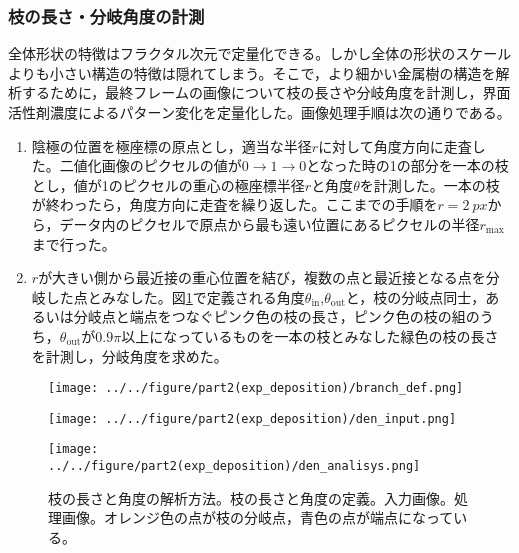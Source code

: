 \documentclass[autodetect-engine,dvi=dvipdfmx,a4paper,ja=standard,oneside,openany,11pt]{bxjsbook}
\begin{document}
\subsubsection{枝の長さ・分岐角度の計測}
全体形状の特徴はフラクタル次元で定量化できる。しかし全体の形状のスケールよりも小さい構造の特徴は隠れてしまう。そこで，より細かい金属樹の構造を解析するために，最終フレームの画像について枝の長さや分岐角度を計測し，界面活性剤濃度によるパターン変化を定量化した。画像処理手順は次の通りである。
\begin{enumerate}
  \item 陰極の位置を極座標の原点とし，適当な半径$r$に対して角度方向に走査した。二値化画像のピクセルの値が$0\rightarrow1\rightarrow0$となった時の1の部分を一本の枝とし，値が1のピクセルの重心の極座標半径$r$と角度$\theta$を計測した。一本の枝が終わったら，角度方向に走査を繰り返した。ここまでの手順を$r=\SI{2}{px}$から，データ内のピクセルで原点から最も遠い位置にあるピクセルの半径$r_{\mathrm{max}}$まで行った。
  \item $r$が大きい側から最近接の重心位置を結び，複数の点と最近接となる点を分岐した点とみなした。図\ref{fig:branch_def_input}で定義される角度$\theta_{\mathrm{in}}$,$\theta_{\mathrm{out}}$と，枝の分岐点同士，あるいは分岐点と端点をつなぐピンク色の枝の長さ，ピンク色の枝の組のうち，$\theta_{\mathrm{out}}$が$0.9\pi$以上になっているものを一本の枝とみなした緑色の枝の長さを計測し，分岐角度を求めた。
\end{enumerate}

\begin{figure}
  \begin{minipage}
    {0.36\textwidth}
    \subcaption{}
    \centering
    \texttt{[image: ../../figure/part2(exp\_deposition)/branch\_def.png]}
    \label{fig:branch_def}
  \end{minipage}
  \begin{minipage}
    {0.31\textwidth}
    \subcaption{}
    \centering
    \texttt{[image: ../../figure/part2(exp\_deposition)/den\_input.png]}
    \label{fig:den_input}
  \end{minipage}
  \begin{minipage}
    {0.31\textwidth}
    \subcaption{}
    \centering
    \texttt{[image: ../../figure/part2(exp\_deposition)/den\_analisys.png]}
    \label{fig:den_analisys}
  \end{minipage}
  \caption{枝の長さと角度の解析方法。枝の長さと角度の定義。入力画像。処理画像。オレンジ色の点が枝の分岐点，青色の点が端点になっている。}
  \label{fig:branch_def_input}
\end{figure}
\end{document}
